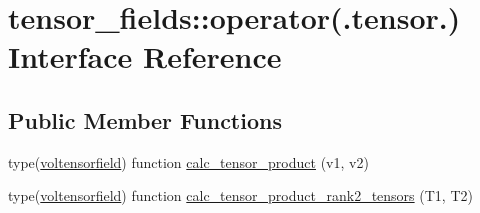 \hypertarget{interfacetensor__fields_1_1operator_07_8tensor_8_08}{\section{tensor\-\_\-fields\-:\-:operator(.tensor.) Interface Reference}
\label{interfacetensor__fields_1_1operator_07_8tensor_8_08}
}
\subsection*{Public Member Functions}
\begin{DoxyCompactItemize}
\item 
type(\hyperlink{structtensor__fields_1_1voltensorfield}{voltensorfield}) function \hyperlink{interfacetensor__fields_1_1operator_07_8tensor_8_08_a984b523afcab102071603b0768d75e48}{calc\-\_\-tensor\-\_\-product} (v1, v2)
\item 
type(\hyperlink{structtensor__fields_1_1voltensorfield}{voltensorfield}) function \hyperlink{interfacetensor__fields_1_1operator_07_8tensor_8_08_a51c19fa58a7aa6a7682a1e84b172c174}{calc\-\_\-tensor\-\_\-product\-\_\-rank2\-\_\-tensors} (T1, T2)
\end{DoxyCompactItemize}



